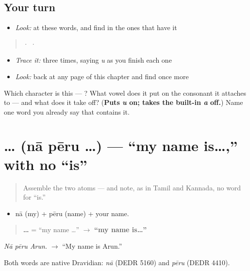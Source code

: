 \subsection*{Your turn}
\begin{itemize}
\raggedright
  \item \emph{Look:} at these words, and find  in the ones that have it
\end{itemize}

\begin{quote}
  ·    ·  
\end{quote}

\begin{itemize}
\raggedright
  \item \emph{Trace it:}  three times, saying \emph{u} as you finish each one
  \item \emph{Look:} back at any page of this chapter and find  once more
\end{itemize}

\begin{tcolorbox}[breakable,colback=teal!4,colframe=teal!35!black,title={Before you move on}]
Which character is this — ? What vowel does it put on the consonant it attaches to — and what does it take off? (\textbf{Puts \emph{u} on; takes the built-in \emph{a} off.}) Name one word you already say that contains it.
\end{tcolorbox}
\section[\texorpdfstring{\te{నా} \te{పేరు} … (nā pēru …)}{నా పేరు … (nā pēru …)}]{  … (nā pēru …) — \textquotedblleft{}my name is…,\textquotedblright{} with no \textquotedblleft{}is\textquotedblright{}}

\label{lesson:TE-C02-naa-peru}



\begin{quote}
Assemble the two atoms — and note, as in Tamil and Kannada, no word for \textquotedblleft{}is.\textquotedblright{}
\end{quote}

\begin{cousinweb}
\begin{itemize}
\raggedright
  \item nā (my) + pēru (name) + your name.
\end{itemize}

\begin{quote}
\textbf{  …} = \textquotedblleft{}my name …\textquotedblright{} $\to$ \textbf{\textquotedblleft{}my name is…\textquotedblright{}}
\end{quote}

\emph{Nā pēru Arun.} $\to$ \textquotedblleft{}My name is Arun.\textquotedblright{}

Both words are native Dravidian: \emph{nā} (DEDR 5160) and \emph{pēru} (DEDR 4410).
\end{cousinweb}

